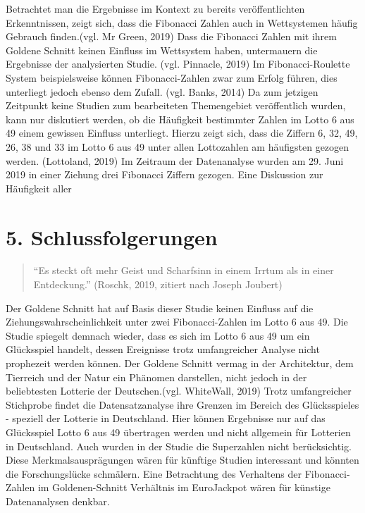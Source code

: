 \documentclass[ngerman,]{article}
\begin{document}
Betrachtet man die Ergebnisse im Kontext zu bereits veröffentlichten
Erkenntnissen, zeigt sich, dass die Fibonacci Zahlen auch in
Wettsystemen häufig Gebrauch finden.(vgl. Mr Green, 2019) Dass die
Fibonacci Zahlen mit ihrem Goldene Schnitt keinen Einfluss im Wettsystem
haben, untermauern die Ergebnisse der analysierten Studie. (vgl.
Pinnacle, 2019) Im Fibonacci-Roulette System beispielsweise können
Fibonacci-Zahlen zwar zum Erfolg führen, dies unterliegt jedoch ebenso
dem Zufall. (vgl. Banks, 2014) Da zum jetzigen Zeitpunkt keine Studien
zum bearbeiteten Themengebiet veröffentlich wurden, kann nur diskutiert
werden, ob die Häufigkeit bestimmter Zahlen im Lotto 6 aus 49 einem
gewissen Einfluss unterliegt. Hierzu zeigt sich, dass die Ziffern 6, 32,
49, 26, 38 und 33 im Lotto 6 aus 49 unter allen Lottozahlen am
häufigsten gezogen werden. (Lottoland, 2019) Im Zeitraum der
Datenanalyse wurden am 29. Juni 2019 in einer Ziehung drei Fibonacci
Ziffern gezogen. Eine Diskussion zur Häufigkeit aller

\section{5. Schlussfolgerungen}\label{schlussfolgerungen}

\begin{quote}
``Es steckt oft mehr Geist und Scharfsinn in einem Irrtum als in einer
Entdeckung.'' (Roschk, 2019, zitiert nach Joseph Joubert)
\end{quote}

Der Goldene Schnitt hat auf Basis dieser Studie keinen Einfluss auf die
Ziehungswahrscheinlichkeit unter zwei Fibonacci-Zahlen im Lotto 6 aus
49. Die Studie spiegelt demnach wieder, dass es sich im Lotto 6 aus 49
um ein Glücksspiel handelt, dessen Ereignisse trotz umfangreicher
Analyse nicht prophezeit werden können. Der Goldene Schnitt vermag in
der Architektur, dem Tierreich und der Natur ein Phänomen darstellen,
nicht jedoch in der beliebtesten Lotterie der Deutschen.(vgl. WhiteWall,
2019) Trotz umfangreicher Stichprobe findet die Datensatzanalyse ihre
Grenzen im Bereich des Glücksspieles - speziell der Lotterie in
Deutschland. Hier können Ergebnisse nur auf das Glücksspiel Lotto 6 aus
49 übertragen werden und nicht allgemein für Lotterien in Deutschland.
Auch wurden in der Studie die Superzahlen nicht berücksichtig. Diese
Merkmalsausprägungen wären für künftige Studien interessant und könnten
die Forschungslücke schmälern. Eine Betrachtung des Verhaltens der
Fibonacci-Zahlen im Goldenen-Schnitt Verhältnis im EuroJackpot wären für
künstige Datenanalysen denkbar.
\end{document}
